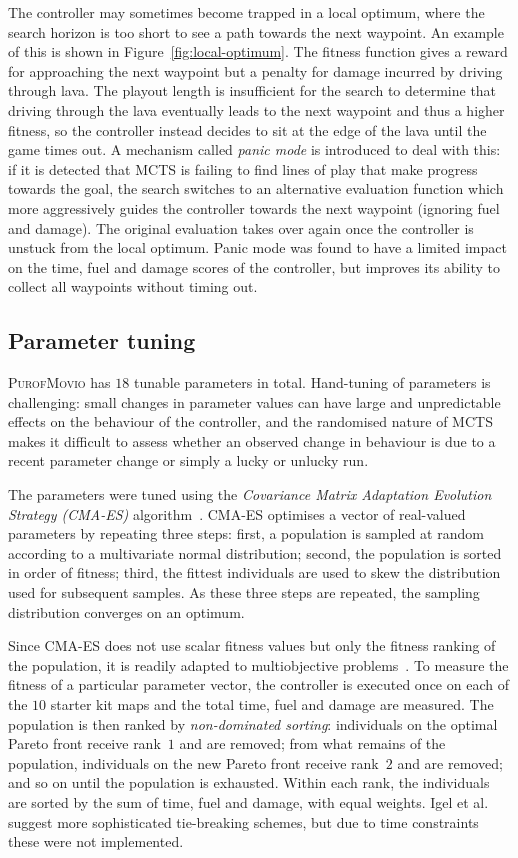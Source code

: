 \documentclass[conference]{IEEEtran}
\begin{document}
The controller may sometimes become trapped in a local optimum,
where the search horizon is too short to see a path towards the next waypoint.
An example of this is shown in Figure~\ref{fig:local-optimum}.
The fitness function gives a reward for approaching the next waypoint but a penalty for damage incurred by driving through lava.
The playout length is insufficient for the search to determine that driving through the lava eventually leads to the next waypoint and thus a higher fitness,
so the controller instead decides to sit at the edge of the lava until the game times out.
A mechanism called \emph{panic mode} is introduced to deal with this:
if it is detected that MCTS is failing to find lines of play that make progress towards the goal,
the search switches to an alternative evaluation function which more aggressively guides the controller towards the next waypoint (ignoring fuel and damage).
The original evaluation takes over again once the controller is unstuck from the local optimum.
Panic mode was found to have a limited impact on the time, fuel and damage scores of the controller,
but improves its ability to collect all waypoints without timing out.

\subsection{Parameter tuning}

\textsc{PurofMovio} has $18$ tunable parameters in total.
Hand-tuning of parameters is challenging:
small changes in parameter values can have large and unpredictable effects on the behaviour of the controller,
and the randomised nature of MCTS makes it difficult to assess whether an observed change in behaviour is due to a recent parameter change
or simply a lucky or unlucky run.

The parameters were tuned using the \emph{Covariance Matrix Adaptation Evolution Strategy (CMA-ES)} algorithm~\cite{Hansen2001}.
CMA-ES optimises a vector of real-valued parameters by repeating three steps:
first, a population is sampled at random according to a multivariate normal distribution;
second, the population is sorted in order of fitness;
third, the fittest individuals are used to skew the distribution used for subsequent samples.
As these three steps are repeated, the sampling distribution converges on an optimum.

Since CMA-ES does not use scalar fitness values but only the fitness ranking of the population,
it is readily adapted to multiobjective problems~\cite{Igel2007}.
To measure the fitness of a particular parameter vector,
the controller is executed once on each of the $10$ starter kit maps and the total time, fuel and damage are measured.
The population is then ranked by \emph{non-dominated sorting}:
individuals on the optimal Pareto front receive rank~$1$ and are removed;
from what remains of the population, individuals on the new Pareto front receive rank~$2$ and are removed;
and so on until the population is exhausted.
Within each rank, the individuals are sorted by the sum of time, fuel and damage, with equal weights.
Igel et al.~\cite{Igel2007} suggest more sophisticated tie-breaking schemes, but due to time constraints these were not implemented.
\end{document}
